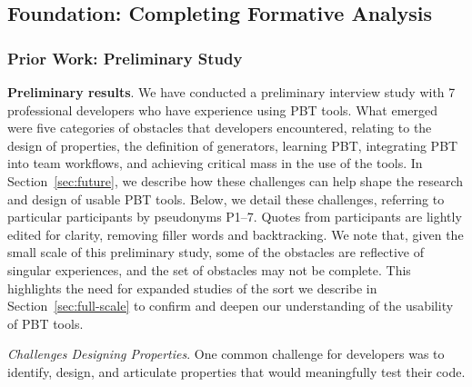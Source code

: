 

%



\subsection{Foundation: Completing Formative Analysis }
\subsubsection{Prior Work: Preliminary Study}

\textbf{Preliminary results}.
We have conducted a preliminary interview study with 7 professional developers
who have experience using PBT tools.
What emerged were five categories of obstacles that developers encountered,
relating
to the design of properties, the definition of generators, learning PBT,
integrating PBT into team workflows, and achieving critical mass in the use of the tools.
In Section~\ref{sec:future}, we describe how these challenges
can help shape the research and design of usable PBT tools.
Below, we detail these challenges, referring to particular participants by
pseudonyms P1--7. Quotes from participants are lightly edited for clarity,
removing filler words and backtracking.
We note that, given the small scale of this preliminary study, some
of the obstacles are reflective of singular experiences, and the set of
obstacles may not be complete. This
highlights the need for expanded
studies of the sort we describe in Section~\ref{sec:full-scale} to confirm
and deepen our understanding of the usability of PBT tools.

\textit{Challenges Designing Properties}.
One common challenge for developers was to identify, design,
and articulate properties that would meaningfully test their code.

